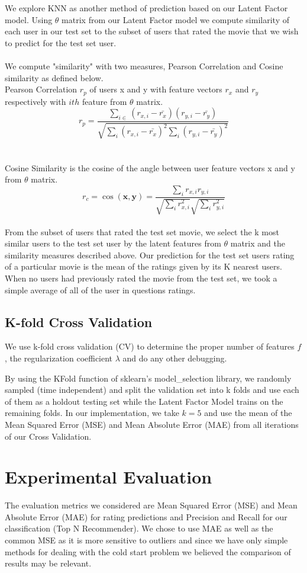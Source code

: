 \documentclass[12pt]{article}
\begin{document}
We explore KNN as another method of prediction based on our Latent Factor model. Using $\theta$ matrix from our Latent Factor model we compute similarity of each user in our test set to the subset of users that rated the movie that we wish to predict for the test set user.  
\\ \\
We compute "similarity" with two measures, Pearson Correlation and Cosine similarity as defined below.
\\
Pearson Correlation $r_{p}$ of users x and y with feature vectors $r_{x}$ and $r_{y}$ respectively with $ith$ feature from $\theta$ matrix.  
$$r_{p} = \dfrac{ \sum_{i\in} (r_{x,i} - \bar{r_{x}})(r_{y,i} - \bar{r_{y}})}{\sqrt{\sum_{i} (r_{x,i} - \bar{r_{x}})^{2} \sum_{i} (r_{y,i} - \bar{r_{y}})^{2}}}$$ 
\\ \\
Cosine Similarity is the cosine of the angle between user feature vectors x and y from $\theta$ matrix.
$$r_{c} = \cos(\textbf{x},\textbf{y}) = \frac{\sum_{i} r_{x,i} r_{y,i} }{\sqrt{\sum_{i} r_{x,i}^2} \sqrt{\sum_{i} r_{y,i}^2}} $$
\\
From the subset of users that rated the test set movie, we select the k most similar users to the test set user by the latent features from $\theta$ matrix and the similarity measures described above. Our prediction for the test set users rating of a particular movie is the mean of the ratings given by its K nearest users. When no users had previously rated the movie from the test set, we took a simple average of all of the user in questions ratings. 

\subsection{K-fold Cross Validation}
We use k-fold cross validation (CV) to determine the proper number of features $f$, the regularization coefficient $\lambda$ and do any other debugging.

By using the KFold function of sklearn's model\_selection library, we randomly sampled (time independent) and split the validation set into k folds and use each of them as a holdout testing set while the Latent Factor Model trains on the remaining folds. In our implementation, we take $k=5$ and use the mean of the Mean Squared Error (MSE) and Mean Absolute Error (MAE) from all iterations of our Cross Validation.

\section{Experimental Evaluation}
The evaluation metrics we considered are Mean Squared Error (MSE) and Mean Absolute Error (MAE) for rating predictions and Precision and Recall for our classification (Top N Recommender). We chose to use MAE as well as the common MSE as it is more sensitive to outliers and since we have only simple methods for dealing with the cold start problem we believed the comparison of results may be relevant.
\end{document}
